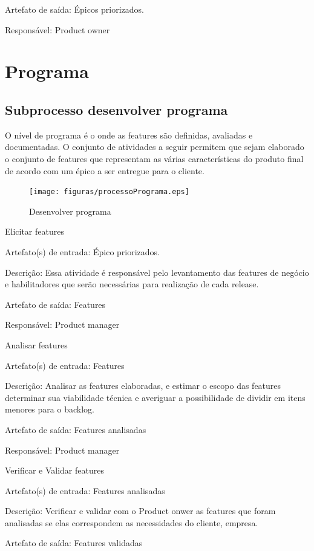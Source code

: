Artefato de saída: Épicos priorizados.

Responsável: Product owner

\section{Programa}

\subsection{Subprocesso desenvolver programa}

O nível de programa é o onde as features são definidas, avaliadas e documentadas. O conjunto de atividades a seguir permitem que sejam elaborado o conjunto de features que representam as várias características do produto final de acordo com um épico a ser entregue para o cliente.

\begin{figure}[H]
    \centering
    \caption{Desenvolver programa}
    \label{processoPrograma}
    \texttt{[image: figuras/processoPrograma.eps]}
\end{figure}




Elicitar features

Artefato(s) de entrada: Épico priorizados.

Descrição: Essa atividade é responsável pelo levantamento das features de negócio e habilitadores que serão necessárias para realização de cada release.

Artefato de saída: Features

Responsável: Product manager

Analisar features

Artefato(s) de entrada: Features

Descrição: Analisar as features elaboradas, e estimar o escopo das features determinar sua viabilidade técnica e averiguar a possibilidade de dividir em itens menores para o backlog.

Artefato de saída: Features analisadas

Responsável: Product manager

Verificar e Validar features

Artefato(s) de entrada: Features analisadas

Descrição: Verificar e validar com o Product onwer as features que foram analisadas se elas correspondem as necessidades do cliente, empresa.

Artefato de saída: Features validadas

